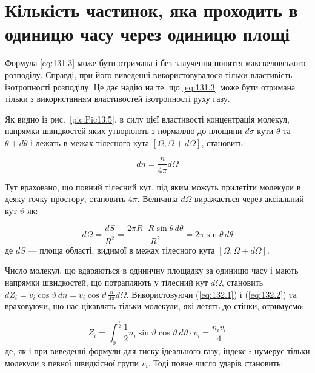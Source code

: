 \section{Кількість частинок, яка проходить в одиницю часу через одиницю площі}

Формула \eqref{eq:131.3} може бути отримана і без залучення поняття максвеловського розподілу.
Справді, при його виведенні використовувалося тільки властивість ізотропності розподілу.
Це дає надію на те, що \eqref{eq:131.3}  може бути отримана тільки з використанням властивостей ізотропності руху газу.

Як видно із рис.~\ref{pic:Pic13.5}, в силу цієї властивості концентрація молекул, напрямки швидкостей яких утворюють з нормаллю до площини $d\sigma$ кути $\theta$ та $\theta + d\theta$ і лежать в межах тілесного кута $[\Omega, \Omega + d\Omega]$, становить:

\begin{equation}
dn = \frac{n}{4\pi} d\Omega
\label{eq:132.1}
\end{equation}

Тут враховано, що повний тілесний кут, під яким можуть прилетіти молекули в деяку точку простору, становить $4\pi$.
Величина $d\Omega$ виражається через аксіальний кут $\vartheta$ як:

\begin{equation}
d\Omega = \frac{dS}{R^2} = \frac{2\pi R \cdot R \sin{\theta} \, d\theta}{R^2} = 2\pi \sin{\theta} \, d\theta
\label{eq:132.2}
\end{equation}
%
де $dS$ --- площа області, видимої в межах тілесного кута $[\Omega, \Omega + d\Omega]$.

Число молекул, що вдаряються в одиничну площадку за одиницю часу і мають напрямки швидкостей, що потрапляють у тілесний кут $d\Omega$, становить
$dZ_i = v_i \cos{\vartheta} \, dn = v_i \cos{\vartheta} \, \frac{n}{4\pi} d\Omega$.
Використовуючи (\ref{eq:132.1}) і (\ref{eq:132.2}) та враховуючи, що нас цікавлять тільки молекули, які летять до стінки, отримуємо:

\begin{equation}
Z_i = \int_{0}^{\frac{\pi}{2}} \frac{1}{2} n_i \sin{\vartheta} \cos{\vartheta} \, d\vartheta \cdot v_i = \frac{n_i v_i}{4}
\label{eq:132.3}
\end{equation}
%
де, як і при виведенні формули для тиску ідеального газу, індекс $i$ нумерує тільки молекули з певної швидкісної групи $v_i$.
Тоді повне число ударів становить:

